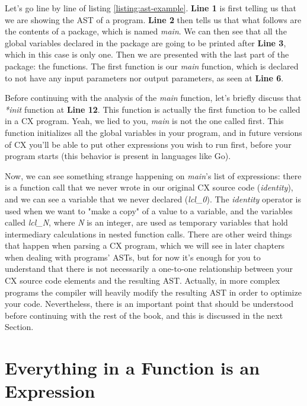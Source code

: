 \documentclass[11pt,fleqn,openany]{book} %
\begin{document}
Let's go line by line of listing \ref{listing:ast-example}. \textbf{Line 1} is first telling us that we are showing the AST of a program. \textbf{Line 2} then tells us that what follows are the contents of a package, which is named \textit{main}. We can then see that all the global variables declared in the package are going to be printed after \textbf{Line 3}, which in this case is only one. Then we are presented with the last part of the package: the functions. The first function is our \textit{main} function, which is declared to not have any input parameters nor output parameters, as seen at \textbf{Line 6}.

Before continuing with the analysis of the \textit{main} function, let's briefly discuss that \textit{*init} function at \textbf{Line 12}. This function is actually the first function to be called in a CX program. Yeah, we lied to you, \textit{main} is not the one called first. This function initializes all the global variables in your program, and in future versions of CX you'll be able to put other expressions you wish to run first, before your program starts (this behavior is present in languages like Go).

Now, we can see something strange happening on \textit{main}'s list of expressions: there is a function call that we never wrote in our original CX source code (\textit{identity}), and we can see a variable that we never declared (\textit{lcl\_0}). The \textit{identity} operator is used when we want to "make a copy" of a value to a variable, and the variables called \textit{lcl\_N}, where \textit{N} is an integer, are used as temporary variables that hold intermediary calculations in nested function calls. There are other weird things that happen when parsing a CX program, which we will see in later chapters when dealing with programs' ASTs, but for now it's enough for you to understand that there is not necessarily a one-to-one relationship between your CX source code elements and the resulting AST. Actually, in more complex programs the compiler will heavily modify the resulting AST in order to optimize your code. Nevertheless, there is an important point that should be understood before continuing with the rest of the book, and this is discussed in the next Section.

\section{Everything in a Function is an Expression}
\end{document}
